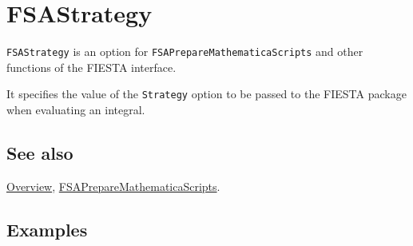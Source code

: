 \documentclass[../FeynHelpersManual.tex]{subfiles}
\begin{document}
\begin{Shaded}
\begin{Highlighting}[]
 
\end{Highlighting}
\end{Shaded}

\hypertarget{fsastrategy}{
\section{FSAStrategy}\label{fsastrategy}}

\texttt{FSAStrategy} is an option for
\texttt{FSAPrepareMathematicaScripts} and other functions of the FIESTA
interface.

It specifies the value of the \texttt{Strategy} option to be passed to
the FIESTA package when evaluating an integral.

\subsection{See also}

\hyperlink{toc}{Overview},
\hyperlink{fsapreparemathematicascripts}{FSAPrepareMathematicaScripts}.

\subsection{Examples}
\end{document}
